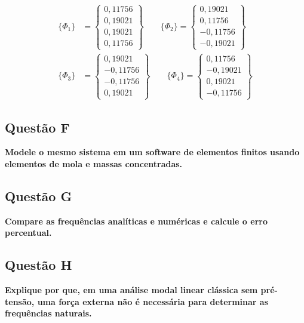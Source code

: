 \documentclass[a4paper, 12pt]{article}
\begin{document}
\begin{equation}
\begin{aligned}
\{\Phi_1\} &=
\begin{Bmatrix}
0{,}11756 \\
0{,}19021 \\
0{,}19021 \\
0{,}11756
\end{Bmatrix}
\qquad
\{\Phi_2\} =
\begin{Bmatrix}
0{,}19021 \\
0{,}11756 \\
-0{,}11756 \\
-0{,}19021
\end{Bmatrix}
\\[1em]
\{\Phi_3\} &=
\begin{Bmatrix}
0{,}19021 \\
-0{,}11756 \\
-0{,}11756 \\
0{,}19021
\end{Bmatrix}
\qquad
\{\Phi_4\} =
\begin{Bmatrix}
0{,}11756 \\
-0{,}19021 \\
0{,}19021 \\
-0{,}11756
\end{Bmatrix}
\end{aligned}
\end{equation}


\subsection{Questão F}

\textbf{Modele o mesmo sistema em um software de elementos finitos usando elementos de mola e massas 
concentradas.}

\subsection{Questão G}

\textbf{Compare as frequências analíticas e numéricas e calcule o erro percentual.}

\subsection{Questão H}

\textbf{Explique por que, em uma análise modal linear clássica sem pré-tensão, uma força externa não é 
necessária para determinar as frequências naturais.}
\end{document}
